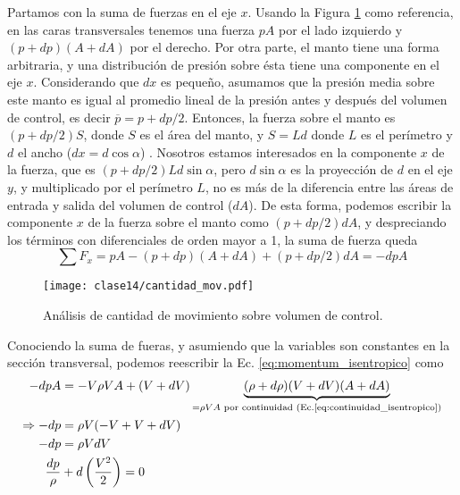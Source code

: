 Partamos con la suma de fuerzas en el eje $x$.
Usando la Figura \ref{fig:cantidad_mov} como referencia, en las caras transversales tenemos una fuerza $pA$ por el lado izquierdo y $(p+dp)(A+dA)$ por el derecho.
Por otra parte, el manto tiene una forma arbitraria, y una distribución de presión sobre ésta tiene una componente en el eje $x$.
Considerando que $dx$ es pequeño, asumamos que la presión media sobre este manto es igual al promedio lineal de la presión antes y después del volumen de control, es decir $\overline{p} = p+dp/2$.
Entonces, la fuerza sobre el manto es $(p+dp/2)S$, donde $S$ es el área del manto, y $S=Ld$ donde $L$ es el perímetro y $d$ el ancho ($dx=d\cos\alpha$) .
Nosotros estamos interesados en la componente $x$ de la fuerza, que es $(p+dp/2)Ld\sin\alpha$, pero $d\sin\alpha$ es la proyección de $d$ en el eje $y$, y multiplicado por el perímetro $L$, no es más de la diferencia entre las áreas de entrada y salida del volumen de control ($dA$).
De esta forma, podemos escribir la componente $x$ de la fuerza sobre el manto como $(p+dp/2)dA$, y despreciando los términos con diferenciales de orden mayor a 1, la suma de fuerza queda
%
\begin{equation}
\sum F_x = pA - (p+dp)(A+dA) + (p+dp/2)dA = -dpA
\end{equation}
%
\begin{figure}
\centering
\texttt{[image: clase14/cantidad\_mov.pdf]}
\caption{Análisis de cantidad de movimiento sobre volumen de control.}
\label{fig:cantidad_mov}
\end{figure}

Conociendo la suma de fueras, y asumiendo que la variables son constantes en la sección transversal, podemos reescribir la Ec. \eqref{eq:momentum_isentropico} como
%
\begin{align}\label{eq:momentum_isen_final}
-dpA &= -V\rho VA + (V+dV)\underbrace{(\rho+d\rho)(V+dV)(A+dA)}_{=\rho VA\text{ por continuidad (Ec.\eqref{eq:continuidad_isentropico})}}\nonumber\\
\Rightarrow -dp &= \rho V(-V+V+dV)\nonumber\\
-dp &= \rho VdV\nonumber\\
\frac{dp}{\rho} &+ d\left(\frac{V^2}{2}\right) = 0
\end{align}

